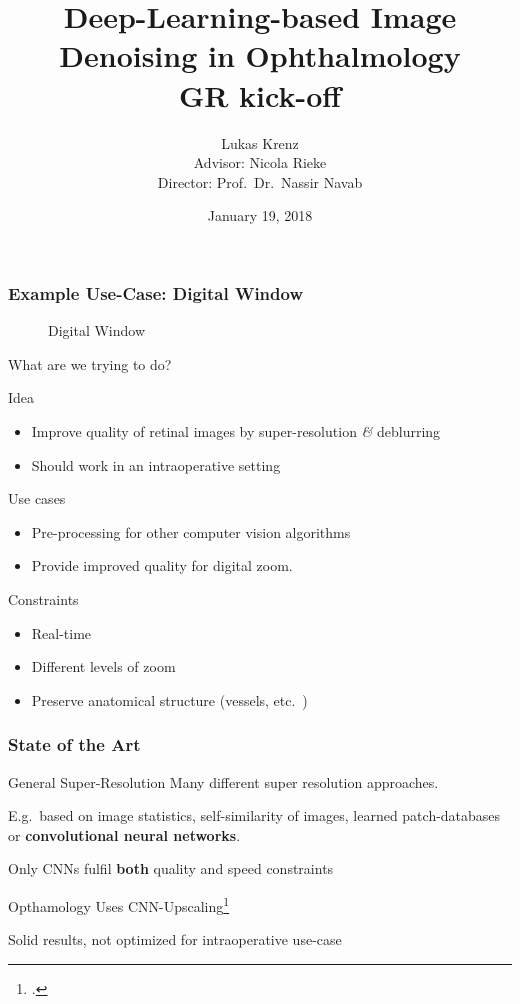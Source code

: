 \documentclass{beamer}
\title{Deep-Learning-based Image Denoising in Ophthalmology\\GR kick-off}
\author{Lukas Krenz\\Advisor: Nicola Rieke\\Director: Prof.\ Dr.\ Nassir Navab}
\date{January 19, 2018}
\institute{TUM, Chair for Computer Aided Medical Procedures \textit{\&} Augmented Reality}
\begin{document}
\maketitle

\begin{frame}
  \frametitle{Example Use-Case: Digital Window}
   \begin{figure}[h]
    \centering
    \caption*{Digital Window}
    \label{fig:digital-window}
  \end{figure}
\end{frame}


\begin{frame}{What are we trying to do?}
\begin{block}{Idea}
\begin{itemize}
\item Improve quality of retinal images by super-resolution \textit{\&} deblurring
\item Should work in an intraoperative setting
\end{itemize}
\end{block}

\begin{block}{Use cases}
\begin{itemize}
\item Pre-processing for other computer vision algorithms
\item Provide improved quality for digital zoom.
\end{itemize}
\end{block}

\begin{block}{Constraints}
  \begin{itemize}
  \item Real-time
  \item Different levels of zoom
  \item Preserve anatomical structure (vessels, etc.\ )
  \end{itemize}
\end{block}
\end{frame}

\begin{frame}
  \frametitle{State of the Art}

\begin{block}{General Super-Resolution}
Many different super resolution approaches.
    
E.g.\ based on image statistics, self-similarity of images, learned patch-databases or \textbf{convolutional neural networks}.

Only CNNs fulfil \textbf{both} quality and speed constraints
\end{block}


\begin{block}{Opthamology}
Uses CNN-Upscaling\footcite{SaliencyGAN} 

Solid results, not optimized for intraoperative use-case
\end{block}
\end{frame}
\end{document}
